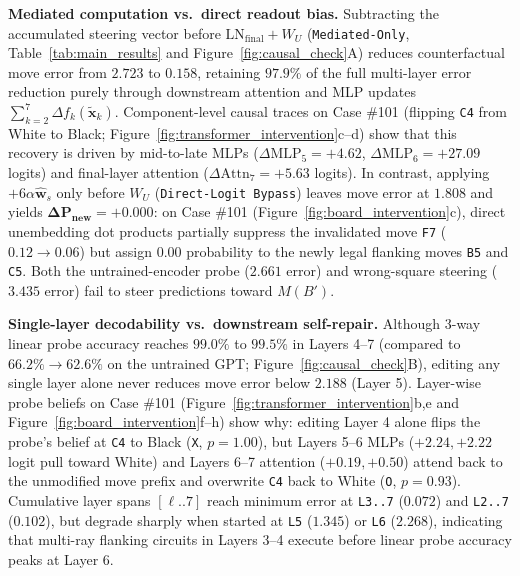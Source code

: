 \documentclass{article}
\begin{document}
\textbf{Mediated computation vs.\ direct readout bias.} Subtracting the accumulated steering vector before $\text{LN}_{\text{final}} + W_U$ (\texttt{Mediated-Only}, Table~\ref{tab:main_results} and Figure~\ref{fig:causal_check}A) reduces counterfactual move error from $2.723$ to $\mathbf{0.158}$, retaining $\mathbf{97.9\%}$ of the full multi-layer error reduction purely through downstream attention and MLP updates $\sum_{k=2}^7 \Delta f_k(\tilde{\mathbf{x}}_k)$. Component-level causal traces on Case \#101 (flipping \texttt{C4} from White to Black; Figure~\ref{fig:transformer_intervention}c--d) show that this recovery is driven by mid-to-late MLPs ($\Delta\text{MLP}_5 = +4.62$, $\Delta\text{MLP}_6 = +27.09$ logits) and final-layer attention ($\Delta\text{Attn}_7 = +5.63$ logits). In contrast, applying $+6\alpha\hat{\mathbf{w}}_s$ only before $W_U$ (\texttt{Direct-Logit Bypass}) leaves move error at $1.808$ and yields $\mathbf{\Delta P_{\text{new}} = +0.000}$: on Case \#101 (Figure~\ref{fig:board_intervention}c), direct unembedding dot products partially suppress the invalidated move \texttt{F7} ($0.12 \to 0.06$) but assign $0.00$ probability to the newly legal flanking moves \texttt{B5} and \texttt{C5}. Both the untrained-encoder probe ($2.661$ error) and wrong-square steering ($3.435$ error) fail to steer predictions toward $M(B')$.

\textbf{Single-layer decodability vs.\ downstream self-repair.} Although 3-way linear probe accuracy reaches $99.0\%$ to $99.5\%$ in Layers 4--7 (compared to $66.2\% \to 62.6\%$ on the untrained GPT; Figure~\ref{fig:causal_check}B), editing any single layer alone never reduces move error below $2.188$ (Layer 5). Layer-wise probe beliefs on Case \#101 (Figure~\ref{fig:transformer_intervention}b,e and Figure~\ref{fig:board_intervention}f--h) show why: editing Layer 4 alone flips the probe's belief at \texttt{C4} to Black (\texttt{X}, $p=1.00$), but Layers 5--6 MLPs ($+2.24, +2.22$ logit pull toward White) and Layers 6--7 attention ($+0.19, +0.50$) attend back to the unmodified move prefix and overwrite \texttt{C4} back to White (\texttt{O}, $p=0.93$). Cumulative layer spans $[\ell..7]$ reach minimum error at \texttt{L3..7} ($0.072$) and \texttt{L2..7} ($0.102$), but degrade sharply when started at \texttt{L5} ($1.345$) or \texttt{L6} ($2.268$), indicating that multi-ray flanking circuits in Layers 3--4 execute before linear probe accuracy peaks at Layer 6.
\end{document}
